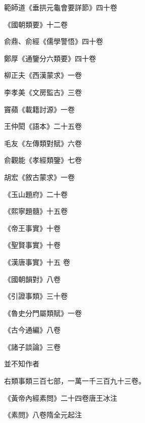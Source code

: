 \begin{pinyinscope}
 範師道《垂拱元龜會要詳節》四十卷



 《國朝類要》十二卷



 俞鼎、俞經《儒學警悟》四十卷



 鄭厚《通鑒分六類要》四十卷



 柳正夫《西漢蒙求》一卷



 李孝美《文房監古》三卷



 竇蘋《載籍討源》一卷



 王仲閎《語本》二十五卷



 毛友《左傳類對賦》六卷



 俞觀能《孝經類鑒》七卷



 胡宏《敘古蒙求》一卷



 《玉山題府》二十卷



 《熙寧題髓》十五卷



 《帝王事實》十卷



 《聖賢事實》十卷



 《漢唐事實》十五
 卷



 《國朝韻對》八卷



 《引證事類》三十卷



 《魯史分門屬類賦》一卷



 《古今通編》八卷



 《諸子談論》三卷



 並不知作者



 右類事類三百七部，一萬一千三百九十三卷。



 《黃帝內經素問》二十四卷唐王冰注



 《素問》八卷隋全元起注




\end{pinyinscope}
